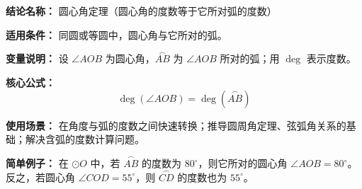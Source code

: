 \textbf{结论名称：} 圆心角定理（圆心角的度数等于它所对弧的度数）

\textbf{适用条件：} 同圆或等圆中，圆心角与它所对的弧。

\textbf{变量说明：} 设 $\angle AOB$ 为圆心角，$\overset{\frown}{AB}$ 为 $\angle AOB$ 所对的弧；用 $\deg$ 表示度数。

\textbf{核心公式：} 
\[
\boxed{\deg(\angle AOB) = \deg(\overset{\frown}{AB})}
\]

\textbf{使用场景：} 在角度与弧的度数之间快速转换；推导圆周角定理、弦弧角关系的基础；解决含弧的度数计算问题。

\textbf{简单例子：} 在 $\odot O$ 中，若 $\overset{\frown}{AB}$ 的度数为 $80^\circ$，则它所对的圆心角 $\angle AOB = 80^\circ$。反之，若圆心角 $\angle COD = 55^\circ$，则 $\overset{\frown}{CD}$ 的度数也为 $55^\circ$。